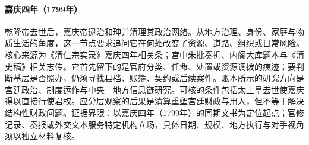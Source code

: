\hypertarget{social:EQ-1799-HESHEN-PURGE}{}\paragraph{嘉庆四年（1799年）}乾隆帝去世后，嘉庆帝逮治和珅并清理其政治网络。从地方治理、身份、家庭与物质生活的角度，这一节点要求追问它在何处改变了资源、道路、组织或日常风险。核心来源为《清仁宗实录》嘉庆四年相关条；宫中朱批奏折、内阁大库题本与《清史稿》相关志传。它首先留下的是官府分类、任命、处置或资源调拨的痕迹；要判断基层是否照办，仍须寻找县档、账簿、契约或后续案件。账本所示的研究方向是宫廷政治、制度运作与中央—地方信息链研究。可核的条件包括太上皇去世使嘉庆得以直接行使君权。应分层观察的后果是清算重塑宫廷财政与用人，但不等于解决结构性财政问题。证据界限：以嘉庆四年（1799年）的同期文书为定位起点；官修记录、奏报或外交文本服务特定机构立场，具体日期、规模、地方执行与对手视角须以独立材料复核。

